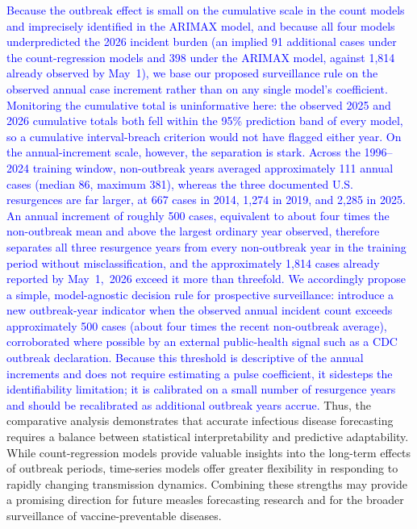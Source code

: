\documentclass[utf8]{FrontiersinHarvard} %
\begin{document}
\textcolor{blue}{Because the outbreak effect is small on the cumulative scale in the count models and imprecisely identified in the ARIMAX model, and because all four models underpredicted the 2026 incident burden (an implied 91 additional cases under the count-regression models and 398 under the ARIMAX model, against 1{,}814 already observed by May~1), we base our proposed surveillance rule on the observed annual case increment rather than on any single model's coefficient. Monitoring the cumulative total is uninformative here: the observed 2025 and 2026 cumulative totals both fell within the 95\% prediction band of every model, so a cumulative interval-breach criterion would not have flagged either year. On the annual-increment scale, however, the separation is stark. Across the 1996--2024 training window, non-outbreak years averaged approximately 111 annual cases (median 86, maximum 381), whereas the three documented U.S. resurgences are far larger, at 667 cases in 2014, 1{,}274 in 2019, and 2{,}285 in 2025. An annual increment of roughly 500 cases, equivalent to about four times the non-outbreak mean and above the largest ordinary year observed, therefore separates all three resurgence years from every non-outbreak year in the training period without misclassification, and the approximately 1{,}814 cases already reported by May~1,~2026 exceed it more than threefold. We accordingly propose a simple, model-agnostic decision rule for prospective surveillance: introduce a new outbreak-year indicator when the observed annual incident count exceeds approximately 500 cases (about four times the recent non-outbreak average), corroborated where possible by an external public-health signal such as a CDC outbreak declaration. Because this threshold is descriptive of the annual increments and does not require estimating a pulse coefficient, it sidesteps the identifiability limitation; it is calibrated on a small number of resurgence years and should be recalibrated as additional outbreak years accrue.}
Thus, the comparative analysis demonstrates that accurate infectious disease forecasting requires a balance between statistical interpretability and predictive adaptability. While count-regression models provide valuable insights into the long-term effects of outbreak periods, time-series models offer greater flexibility in responding to rapidly changing transmission dynamics. Combining these strengths may provide a promising direction for future measles forecasting research and for the broader surveillance of vaccine-preventable diseases.
\end{document}
